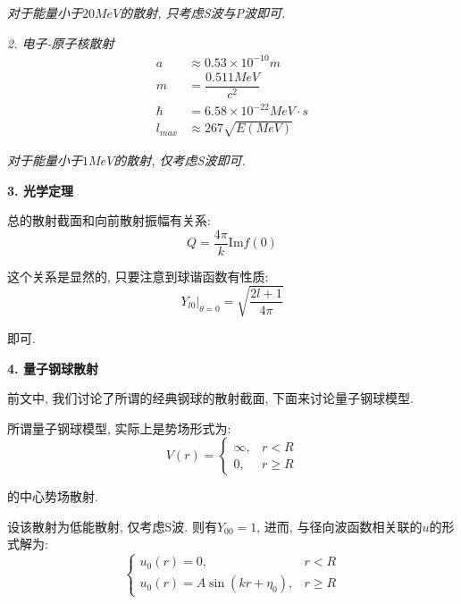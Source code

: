 \documentclass[a4paper, 11pt]{article}
\begin{document}
\begin{spacing}{1.2}
          \emph{对于能量小于$20MeV$的散射, 只考虑S波与P波即可.}

          \emph{2. 电子-原子核散射}
          \begin{equation}
            \begin{aligned}
              a &\approx 0.53\times10^{-10}m\\
              m &= \dfrac{0.511MeV}{c^2}\\
              \hbar &= 6.58\times10^{-22}MeV\cdot{}s\\
              l_{max} &\approx 267\sqrt{E(MeV)}
            \end{aligned}
          \end{equation}
            
          \emph{对于能量小于$1MeV$的散射, 仅考虑S波即可.}

          \textbf{3. 光学定理}
          
          总的散射截面和向前散射振幅有关系:
          \begin{equation}
            Q = \dfrac{4\pi}{k}\mathrm{Im}f(0)
          \end{equation}

          这个关系是显然的, 只要注意到球谐函数有性质:
          \begin{equation*}
            Y_{l0}|_{\theta = 0} = \sqrt{\dfrac{2l+1}{4\pi}}
          \end{equation*}

          即可. 

          \textbf{4. 量子钢球散射}

          前文中, 我们讨论了所谓的经典钢球的散射截面, 下面来讨论量子钢球模型.

          所谓量子钢球模型, 实际上是势场形式为:
          \begin{equation}
            V(r) = \left\{
            \begin{array}{rl}
              \infty, & r<R\\
              0, & r\geq{}R
            \end{array}\right.
          \end{equation}

          的中心势场散射. 

          设该散射为低能散射, 仅考虑S波. 则有$Y_{00} = 1$, 进而, 与径向波函数相关联的$u$的形式解为:
          \begin{equation}
            \left\{
            \begin{array}{ll}
              u_0(r) = 0, & r < R \\
              u_0(r) = A\sin(kr+\eta_0), & r\geq{}R
            \end{array}\right.
          \end{equation}


\end{spacing}
\end{document}
